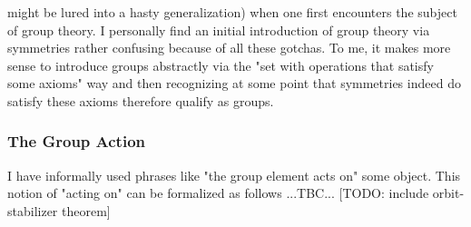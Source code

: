 might be lured into a hasty generalization) when one first encounters the subject of group theory. I personally find an initial introduction of group theory via symmetries rather confusing because of all these gotchas. To me, it makes more sense to introduce groups abstractly via the "set with operations that satisfy some axioms" way and then recognizing at some point that symmetries indeed do satisfy these axioms therefore qualify as groups.









\subsubsection{The Group Action} I have informally used phrases like "the group element acts on" some object. This notion of "acting on" can be formalized as follows ...TBC... [TODO:  include orbit-stabilizer theorem]

